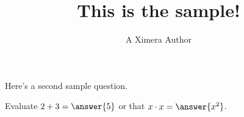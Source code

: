 \documentclass{ximera}
\title{This is the sample!}
\author{A Ximera Author}
\begin{document}
\maketitle

Here's a second sample question.

\begin{problem}
\begin{multipleChoice}
\end{multipleChoice}
\end{problem}

\begin{problem}
   Evaluate $2 + 3 = \answer{5}$ or that $x \cdot x = \answer{x^2}$.
\end{problem}

\end{document}
